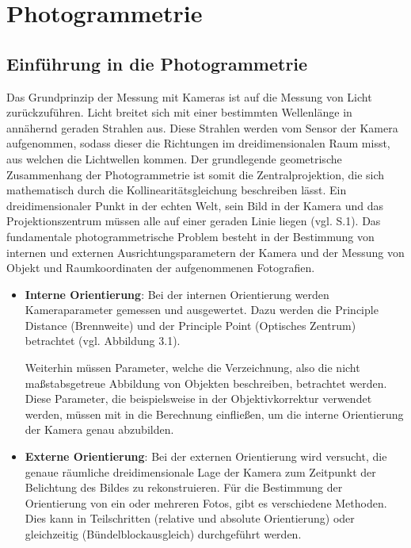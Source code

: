 \chapter{Photogrammetrie}

\section{Einführung in die Photogrammetrie}

Das Grundprinzip der Messung mit Kameras ist auf die Messung von Licht zurückzuführen. Licht breitet sich mit einer bestimmten Wellenlänge in annähernd geraden Strahlen aus. Diese Strahlen werden vom Sensor der Kamera aufgenommen, sodass dieser die Richtungen im dreidimensionalen Raum misst, aus welchen die Lichtwellen kommen. Der grundlegende geometrische Zusammenhang der Photogrammetrie ist somit die Zentralprojektion, die sich mathematisch durch die Kollinearitätsgleichung beschreiben lässt. Ein dreidimensionaler Punkt in der echten Welt, sein Bild in der Kamera und das Projektionszentrum müssen alle auf einer geraden Linie liegen (vgl. \cite{fiundations_pg} S.1). Das fundamentale photogrammetrische Problem besteht in der Bestimmung von internen und externen Ausrichtungsparametern der Kamera und der  Messung von Objekt und Raumkoordinaten der aufgenommenen Fotografien. 

\begin{itemize}
\item \textbf{Interne Orientierung}: Bei der internen Orientierung werden Kameraparameter gemessen und ausgewertet. Dazu werden die \glqq Principle Distance\grqq{} (Brennweite) und der \glqq Principle Point\grqq{} (Optisches Zentrum) betrachtet (vgl. Abbildung 3.1).

Weiterhin müssen Parameter, welche die Verzeichnung, also die nicht maßstabsgetreue Abbildung von Objekten beschreiben, betrachtet werden. Diese Parameter, die beispielsweise in der Objektivkorrektur verwendet werden, müssen mit in die Berechnung einfließen, um die interne Orientierung der Kamera genau abzubilden.

\item \textbf{Externe Orientierung}: Bei der externen Orientierung wird versucht, die genaue räumliche dreidimensionale Lage der Kamera zum Zeitpunkt der Belichtung des Bildes zu rekonstruieren. Für die Bestimmung der Orientierung von ein oder mehreren Fotos, gibt es verschiedene Methoden. Dies kann in Teilschritten (relative und absolute Orientierung) oder gleichzeitig (Bündelblockausgleich) durchgeführt werden. 
\end{itemize}

